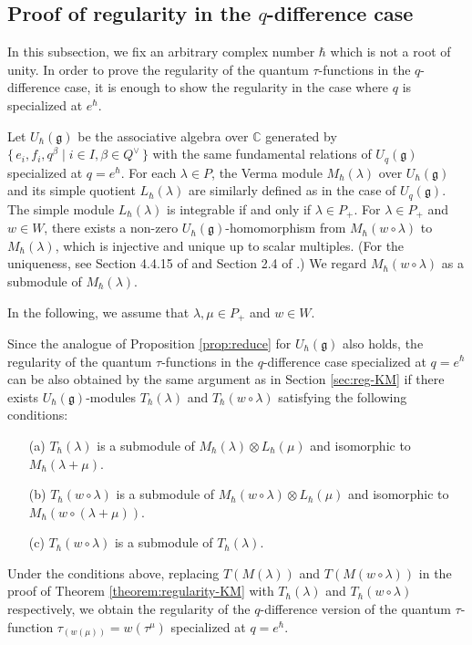\documentclass[12pt,twoside]{article}
\newcommand\Qv{Q^\vee}
\newcommand\g{{\mathfrak g}}
\newcommand\C{{\mathbb C}} %
\theoremstyle{plain} %
\theoremstyle{definition} %
\theoremstyle{definition} %
\numberwithin{theorem}{section}
\numberwithin{equation}{section}
\numberwithin{figure}{section}
\numberwithin{table}{section}
\newcommand\secref[1]{Section \ref{#1}}
\newcommand\theoremref[1]{Theorem \ref{#1}}
\newcommand\propref[1]{Proposition \ref{#1}}
\begin{document}

\subsection{Proof of regularity in the $q$-difference case}
\label{sec:reg-q}

In this subsection, we fix an arbitrary complex number $\hbar$ which is not a root of unity.
In order to prove the regularity of the quantum $\tau$-functions
in the $q$-difference case, it is enough to show 
the regularity in the case where $q$ is specialized at $e^\hbar$.

Let $U_\hbar(\g)$ be the associative algebra over $\C$ generated by 
$\{\,e_i,f_i,q^\beta\mid i\in I, \beta\in\Qv \,\}$ with the same fundamental
relations of $U_q(\g)$ specialized at $q=e^\hbar$. 
For each $\lambda\in P$, the Verma module $M_\hbar(\lambda)$ over $U_\hbar(\g)$ and 
its simple quotient $L_\hbar(\lambda)$ are similarly defined 
as in the case of $U_q(\g)$.
The simple module $L_\hbar(\lambda)$ is integrable if and only if $\lambda\in P_+$.
For $\lambda\in P_+$ and $w\in W$, there exists a non-zero $U_\hbar(\g)$-homomorphism 
from $M_\hbar(w\circ\lambda)$ to $M_\hbar(\lambda)$,  
which is injective and unique up to scalar multiples.
(For the uniqueness, 
see Section 4.4.15 of \cite{Jos-1995} and Section 2.4 of \cite{HK-2007}.)
We regard $M_\hbar(w\circ\lambda)$ as a submodule of $M_\hbar(\lambda)$.

In the following, we assume that $\lambda,\mu\in P_+$ and $w\in W$.

Since the analogue of \propref{prop:reduce} for $U_\hbar(\g)$ also holds,
the regularity of the quantum $\tau$-functions in the $q$-difference case
specialized at $q=e^\hbar$ can be also obtained by the same argument 
as in \secref{sec:reg-KM} 
if there exists $U_\hbar(\g)$-modules $T_\hbar(\lambda)$ and $T_\hbar(w\circ\lambda)$
satisfying the following conditions:
\begin{enumerate}
\item[(a)] $T_\hbar(\lambda)$ is a submodule 
  of $M_\hbar(\lambda)\otimes L_\hbar(\mu)$
  and isomorphic to $M_\hbar(\lambda+\mu)$.
\item[(b)] $T_\hbar(w\circ\lambda)$ is a submodule 
  of $M_\hbar(w\circ\lambda)\otimes L_\hbar(\mu)$
  and isomorphic to $M_\hbar(w\circ(\lambda+\mu))$.
\item[(c)] $T_\hbar(w\circ\lambda)$ is a submodule of $T_\hbar(\lambda)$.
\end{enumerate}
Under the conditions above, replacing $T(M(\lambda))$ and $T(M(w\circ\lambda))$
in the proof of \theoremref{theorem:regularity-KM} 
with $T_\hbar(\lambda)$ and $T_\hbar(w\circ\lambda)$ respectively, 
we obtain the regularity of the $q$-difference version of 
the quantum $\tau$-function $\tau_{(w(\mu))}=w(\tau^\mu)$ specialized at $q=e^\hbar$.
\end{document}
